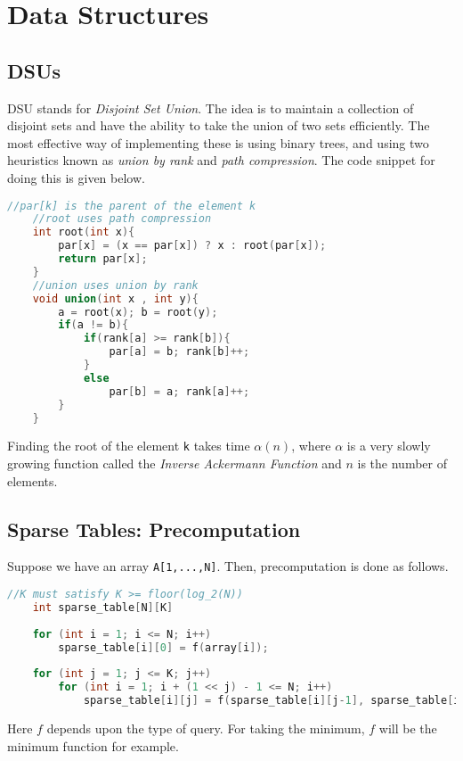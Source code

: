 \documentclass[12pt,a4paper]{amsart}
\numberwithin{equation}{section}
\theoremstyle{definition}
\begin{document}
\section{Data Structures}

\subsection{DSUs} DSU stands for \textit{Disjoint Set Union}. The idea is to maintain a collection of disjoint sets and have the ability to take the union of two sets efficiently. The most effective way of implementing these is using binary trees, and using two heuristics known as \textit{union by rank} and \textit{path compression}. The code snippet for doing this is given below. 

\begin{lstlisting}[language=C++]
    //par[k] is the parent of the element k
    //root uses path compression
    int root(int x){
        par[x] = (x == par[x]) ? x : root(par[x]);
        return par[x];
    }  
    //union uses union by rank
    void union(int x , int y){
        a = root(x); b = root(y);
        if(a != b){
            if(rank[a] >= rank[b]){
                par[a] = b; rank[b]++;
            }
            else 
                par[b] = a; rank[a]++;
        }
    }
\end{lstlisting}
Finding the root of the element \verb|k| takes time $\alpha(n)$, where $\alpha$ is a very slowly growing function called the \textit{Inverse Ackermann Function} and $n$ is the number of elements.

\subsection{Sparse Tables: Precomputation} Suppose we have an array \verb|A[1,...,N]|. Then, precomputation is done as follows.
\begin{lstlisting}[language=C++]
    //K must satisfy K >= floor(log_2(N))
    int sparse_table[N][K]
    
    for (int i = 1; i <= N; i++)
        sparse_table[i][0] = f(array[i]);
        
    for (int j = 1; j <= K; j++)
        for (int i = 1; i + (1 << j) - 1 <= N; i++)
            sparse_table[i][j] = f(sparse_table[i][j-1], sparse_table[i + (1 << (j - 1))][j - 1]);
\end{lstlisting}
Here $f$ depends upon the type of query. For taking the minimum, $f$ will be the minimum function for example. 
\end{document}

